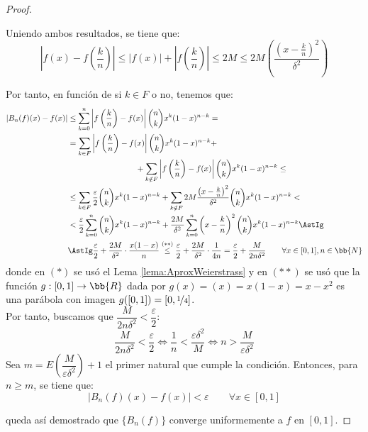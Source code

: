 \begin{proof}
\begin{itemize}
        Uniendo ambos resultados, se tiene que:
        \begin{equation*}
            \left| f(x) - f\left(\frac{k}{n}\right) \right|
            \leq |f(x)| + \left|f\left(\frac{k}{n}\right)\right|
            \leq 2M \leq 2M\left(\frac{\left(x-\frac{k}{n}\right)^2}{\delta^2}\right)
        \end{equation*}
    \end{itemize}

    Por tanto, en función de si $k\in F$ o no, tenemos que:
    \begin{align*}
        \left| B_n(f)(x) - f(x) \right| &\leq \sum_{k=0}^n \left| f\left(\frac{k}{n}\right) - f(x) \right|\binom{n}{k} x^k(1-x)^{n-k} =\\
        &= \sum_{k\in F} \left| f\left(\frac{k}{n}\right) - f(x) \right|\binom{n}{k} x^k(1-x)^{n-k} +\\&\hspace{3cm} +\sum_{k\notin F} \left| f\left(\frac{k}{n}\right) - f(x) \right|\binom{n}{k} x^k(1-x)^{n-k} \leq\\
        &\leq \sum_{k\in F} \frac{\varepsilon}{2}\binom{n}{k} x^k(1-x)^{n-k} + \sum_{k\notin F} 2M\frac{\left(x-\frac{k}{n}\right)^2}{\delta^2}\binom{n}{k} x^k(1-x)^{n-k} <\\
        &< \frac{\varepsilon}{2}\sum_{k=0}^n \binom{n}{k} x^k(1-x)^{n-k} + \frac{2M}{\delta^2}\sum_{k=0}^n \left(x-\frac{k}{n}\right)^2\binom{n}{k} x^k(1-x)^{n-k} \AstIg\\
        &\AstIg \frac{\varepsilon}{2} + \frac{2M}{\delta^2}\cdot \frac{x(1-x)}{n} \stackrel{(\ast\ast)}{\leq}
        \frac{\varepsilon}{2} + \frac{2M}{\delta^2}\cdot \frac{1}{4n} = \frac{\varepsilon}{2} + \frac{M}{2n\delta^2}
        \qquad \forall x\in [0,1], n\in \bb{N}
    \end{align*}
    donde en $(\ast)$ se usó el Lema \ref{lema:AproxWeierstrass} y en $(\ast\ast)$ se usó que la función $g:[0,1]\to \bb{R}$ dada por $g(x)=(x)=x(1-x)=x-x^2$ es una parábola con imagen $g([0,1])=[0,\nicefrac{1}{4}]$.\\

    Por tanto, buscamos que $\dfrac{M}{2n\delta^2}<\dfrac{\varepsilon}{2}$:
    \begin{equation*}
        \dfrac{M}{2n\delta^2}<\dfrac{\varepsilon}{2}
        \Longleftrightarrow
        \frac{1}{n} < \frac{\varepsilon\delta^2}{M}
        \Longleftrightarrow
        n > \frac{M}{\varepsilon\delta^2}
    \end{equation*}
    Sea $m=E\left(\dfrac{M}{\varepsilon\delta^2}\right)+1$ el primer natural que cumple la condición. Entonces, para $n\geq m$,
    se tiene que:
    \begin{equation*}
        \left| B_n(f)(x) - f(x) \right| < \varepsilon
        \qquad \forall x\in [0,1]
    \end{equation*}

    queda así demostrado que $\{B_n(f)\}$ converge uniformemente a $f$ en $[0,1]$.
\end{proof}

